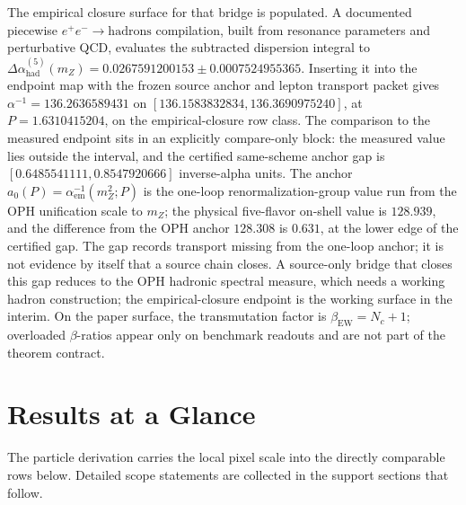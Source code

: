 \documentclass[11pt]{article}
\begin{document}
The empirical closure surface for that bridge is populated. A documented piecewise
\(e^+e^-\to\mathrm{hadrons}\) compilation, built from resonance parameters and perturbative QCD,
evaluates the subtracted dispersion integral to
\(\Delta\alpha_{\mathrm{had}}^{(5)}(m_Z)=0.0267591200153\pm0.0007524955365\).
Inserting it into the endpoint map with the frozen source anchor and lepton transport packet gives
\(\alpha^{-1}=136.2636589431\) on
\([136.1583832834,136.3690975240]\), at \(P=1.6310415204\), on the
empirical-closure row class.
The comparison to the measured endpoint sits in an explicitly compare-only block: the measured
value lies outside the interval, and the certified same-scheme anchor gap is
\([0.6485541111,0.8547920666]\) inverse-alpha units. The anchor \(a_0(P)=\alpha_{\mathrm{em}}^{-1}(m_Z^2;P)\) is the
one-loop renormalization-group value run from the OPH unification scale to \(m_Z\); the physical
five-flavor on-shell value is \(128.939\), and the difference from the OPH anchor \(128.308\) is
\(0.631\), at the lower edge of the certified gap. The gap records transport missing from the
one-loop anchor; it is not evidence by itself that a source chain closes. A source-only bridge
that closes this gap reduces to the OPH hadronic spectral measure,
which needs a working hadron construction; the empirical-closure endpoint is the working surface in
the interim.
On the paper surface, the transmutation factor is \(\beta_{\mathrm{EW}}=N_c+1\); overloaded \(\beta\)-ratios appear only on benchmark readouts and are not part of the theorem contract.

\section{Results at a Glance}

The particle derivation carries the local pixel scale into the directly comparable rows below.
Detailed scope statements are collected in the support sections that follow.
\end{document}
